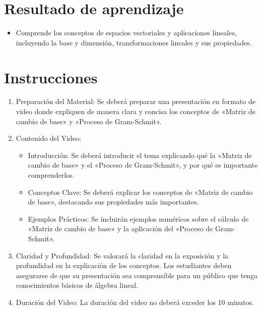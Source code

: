 \documentclass[a4,11pt]{aleph-notas}
\begin{document}
\encabezado

\section{Resultado de aprendizaje}

\begin{itemize}
\item 
    Comprende los conceptos de espacios vectoriales y aplicaciones lineales, incluyendo la base y dimensión, transformaciones lineales y sus propiedades.
\end{itemize}


\section{Instrucciones}

\begin{enumerate}
    \item Preparación del Material: Se deberá preparar una presentación en formato de video donde expliquen de manera clara y concisa los conceptos de «Matriz de cambio de base» y «Proceso de Gram-Schmit».
    \item Contenido del Video:
    \begin{itemize}
        \item Introducción: Se deberá introducir el tema explicando qué la «Matriz de cambio de base» y el «Proceso de Gram-Schmit», y por qué es importante comprenderlos.
        \item Conceptos Clave: Se deberá explicar los conceptos de «Matriz de cambio de base», destacando sus propiedades más importantes.
        \item Ejemplos Prácticos: Se incluirán ejemplos numéricos sobre el cálculo de «Matriz de cambio de base» y la aplicación del «Proceso de Gram-Schmit».
    \end{itemize}
    \item Claridad y Profundidad: Se valorará la claridad en la exposición y la profundidad en la explicación de los conceptos. Los estudiantes deben asegurarse de que su presentación sea comprensible para un público que tenga conocimientos básicos de álgebra lineal.
    \item Duración del Video: La duración del video no deberá exceder los 10 minutos.
\end{enumerate}
\end{document}
